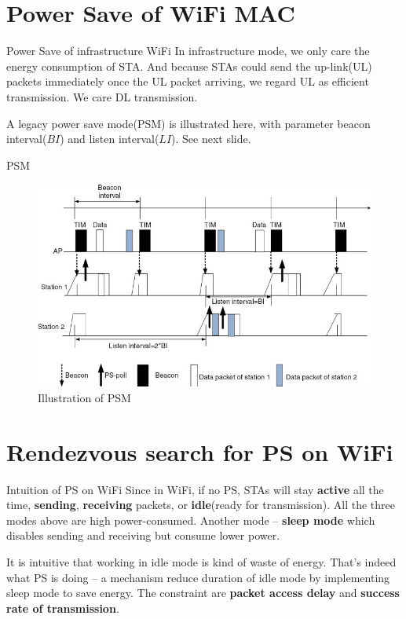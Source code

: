 \documentclass[10pt]{beamer}
\begin{document}
    \section{Power Save of WiFi MAC}
    \begin{frame}{Power Save of infrastructure WiFi}
        In infrastructure mode, we only care the energy consumption of STA. And because STAs could send the up-link(UL) packets immediately once the UL packet arriving, we regard UL as efficient transmission. 
        We care DL transmission.

        A legacy power save mode(PSM) is illustrated here, with parameter beacon interval($BI$) and listen interval($LI$). See next slide. 
    \end{frame}
    \begin{frame}{PSM}
        \begin{figure}
            \centering
            \includegraphics[scale=0.8]{./figure/legacy_PSM.jpg}
            \caption{Illustration of PSM \cite{xie2014adaptive}}
            \label{PSM}
        \end{figure}
    \end{frame}
    \section{Rendezvous search for PS on WiFi}
    \begin{frame}{Intuition of PS on WiFi}
        Since in WiFi, if no PS, STAs will stay \textbf{active} all the time, \textbf{sending}, \textbf{receiving} packets, or \textbf{idle}(ready for transmission). All the three modes above are high power-consumed. Another mode -- \textbf{sleep mode} which disables sending and receiving but consume lower power.

        It is intuitive that working in idle mode is kind of waste of energy. That's indeed what PS is doing -- a mechanism reduce duration of idle mode by implementing sleep mode to save energy. The constraint are \textbf{packet access delay} and \textbf{success rate of transmission}. 
    \end{frame}
\end{document}
